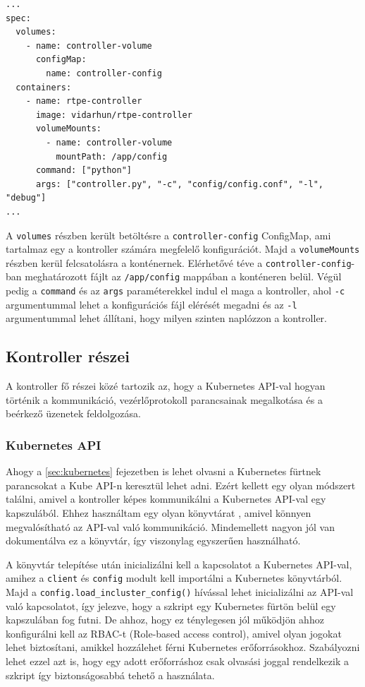\begin{lstlisting}[caption=Kubernetes konténer specifikációja, label=lst:kubeSpec]
...
spec:
  volumes:
    - name: controller-volume
      configMap:
        name: controller-config
  containers:
    - name: rtpe-controller
      image: vidarhun/rtpe-controller
      volumeMounts:
        - name: controller-volume
          mountPath: /app/config
      command: ["python"]
      args: ["controller.py", "-c", "config/config.conf", "-l", "debug"]
...
\end{lstlisting}

A \texttt{volumes} részben került betöltésre a \texttt{controller-config} ConfigMap, ami 
tartalmaz egy a kontroller számára megfelelő konfigurációt. Majd a 
\texttt{volumeMounts} részben kerül felcsatolásra a konténernek. Elérhetővé téve a 
\texttt{controller-config}-ban meghatározott fájlt az \texttt{/app/config} mappában a 
konténeren belül. Végül pedig a \texttt{command} és az \texttt{args} paraméterekkel indul 
el maga a kontroller, ahol \texttt{-c} argumentummal lehet a konfigurációs fájl elérését 
megadni és az \texttt{-l} argumentummal lehet állítani, hogy milyen szinten naplózzon a 
kontroller.

\subsection{Kontroller részei}

A kontroller fő részei közé tartozik az, hogy a Kubernetes API-val 
hogyan történik a kommunikáció, vezérlőprotokoll parancsainak megalkotása és
a beérkező üzenetek feldolgozása. 

\subsubsection{Kubernetes API}

Ahogy a \ref{sec:kubernetes} fejezetben is lehet olvasni a Kubernetes
fürtnek parancsokat a Kube API-n keresztül lehet adni. Ezért kellett egy olyan
módszert találni, amivel a kontroller képes kommunikálni a Kubernetes API-val 
egy kapszulából. Ehhez használtam egy olyan könyvtárat \cite{pythonKubeAPI}, amivel
könnyen megvalósítható az API-val való kommunikáció. Mindemellett nagyon jól
van dokumentálva ez a könyvtár, így viszonylag egyszerűen használható.

A könyvtár telepítése után inicializálni kell a kapcsolatot a Kubernetes 
API-val, amihez a \texttt{client} és \texttt{config} modult kell importálni
a Kubernetes könyvtárból. Majd a \texttt{config.load\_incluster\_config()}
hívással lehet inicializálni az API-val való kapcsolatot, így jelezve, hogy a
szkript egy Kubernetes fürtön belül egy kapszulában fog futni. De ahhoz, hogy ez 
ténylegesen jól működjön ahhoz konfigurálni kell az RBAC-t (Role-based access control), 
amivel olyan jogokat lehet biztosítani, amikkel hozzálehet férni Kubernetes  
erőforrásokhoz. Szabályozni lehet ezzel azt is, hogy egy adott erőforráshoz  csak 
olvasási joggal rendelkezik a szkript így biztonságosabbá tehető a használata.

